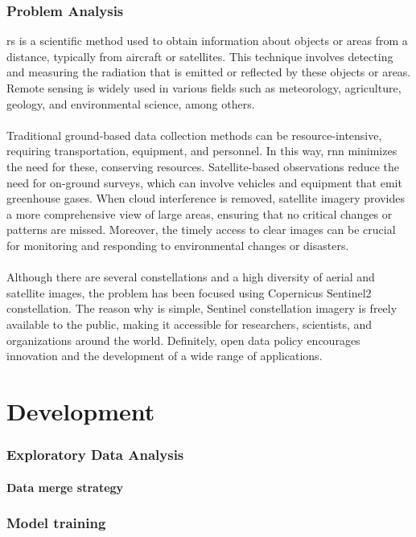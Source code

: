 \documentclass[11pt, a4paper]{article}
\begin{document}
	\section{Problem Analysis}
	\gls{rs} is a scientific method used to obtain information about objects or areas from a distance, typically from aircraft or satellites. This technique involves detecting and measuring the radiation that is emitted or reflected by these objects or areas. Remote sensing is widely used in various fields such as meteorology, agriculture, geology, and environmental science, among others.
	\\
	\\
	Traditional ground-based data collection methods can be resource-intensive, requiring transportation, equipment, and personnel. In this way, \gls{rnn} minimizes the need for these, conserving resources. Satellite-based observations reduce the need for on-ground surveys, which can involve vehicles and equipment that emit greenhouse gases. When cloud interference is removed, satellite imagery provides a more comprehensive view of large areas, ensuring that no critical changes or patterns are missed. Moreover, the timely access to clear images can be crucial for monitoring and responding to environmental changes or disasters.
	\\
	\\
	Although there are several constellations and a high diversity of aerial and satellite images, the problem has been focused using Copernicus Sentinel2 constellation. The reason why is simple, Sentinel constellation imagery is freely available to the public, making it accessible for researchers, scientists, and organizations around the world. Definitely, open data policy encourages innovation and the development of a wide range of applications.
	
	\newpage
	\part{Development}
	\section{Exploratory Data Analysis}
	
	\subsection{Data merge strategy}
	
	\newpage
	\section{Model training}
\end{document}
